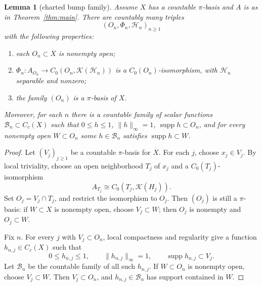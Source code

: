 \documentclass[11pt]{article}
\newtheorem{lemma}{Lemma}
\newcommand{\Kcal}{\mathcal K}
\newcommand{\supp}{\operatorname{supp}}
\begin{document}
\begin{lemma}[charted bump family]
\label{lem:charted}
Assume \(X\) has a countable \(\pi\)-basis and \(A\) is as in
Theorem~\ref{thm:main}.  There are countably many triples
\[
        (O_n,\Phi_n,\mathcal H_n)_{n\ge1}
\]
with the following properties:
\begin{enumerate}
    \item each \(O_n\subset X\) is nonempty open;
    \item \(\Phi_n:A_{O_n}\to C_0(O_n,\Kcal(\mathcal H_n))\) is a
    \(C_0(O_n)\)-isomorphism, with \(\mathcal H_n\) separable and nonzero;
    \item the family \((O_n)\) is a \(\pi\)-basis of \(X\).
\end{enumerate}
Moreover, for each \(n\) there is a countable family of scalar functions
\(\mathcal B_n\subset C_c(X)\) such that \(0\le h\le1\), \(\|h\|_\infty=1\),
\(\supp h\subset O_n\), and for every nonempty open \(W\subset O_n\) some
\(h\in\mathcal B_n\) satisfies \(\supp h\subset W\).
\end{lemma}

\begin{proof}
Let \((V_j)_{j\ge1}\) be a countable \(\pi\)-basis for \(X\).  For each \(j\),
choose \(x_j\in V_j\).  By local triviality, choose an open neighborhood
\(T_j\) of \(x_j\) and a \(C_0(T_j)\)-isomorphism
\[
        A_{T_j}\cong C_0(T_j,\Kcal(H_j)).
\]
Set \(O_j=V_j\cap T_j\), and restrict the isomorphism to \(O_j\).  Then
\((O_j)\) is still a \(\pi\)-basis: if \(W\subset X\) is nonempty open, choose
\(V_j\subset W\); then \(O_j\) is nonempty and \(O_j\subset W\).

Fix \(n\).  For every \(j\) with \(V_j\subset O_n\), local compactness and
regularity give a function \(h_{n,j}\in C_c(X)\) such that
\[
        0\le h_{n,j}\le1,\qquad \|h_{n,j}\|_\infty=1,\qquad
        \supp h_{n,j}\subset V_j.
\]
Let \(\mathcal B_n\) be the countable family of all such \(h_{n,j}\).  If
\(W\subset O_n\) is nonempty open, choose \(V_j\subset W\).  Then
\(V_j\subset O_n\), and \(h_{n,j}\in\mathcal B_n\) has support contained in
\(W\).
\end{proof}
\end{document}
